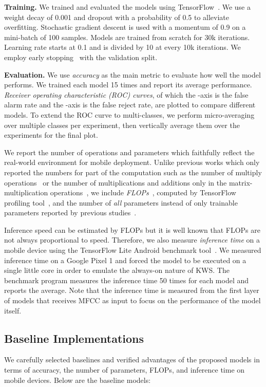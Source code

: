 \documentclass[a4paper]{article}
\begin{document}
\textbf{Training.}
We trained and evaluated the models using TensorFlow~\cite{abadi-osdi-2016-TensorFlow}. 
We use a weight decay of 0.001 and dropout with a probability of 0.5 to alleviate overfitting.
Stochastic gradient descent is used with a momentum of 0.9 on a mini-batch of 100 samples.
Models are trained from scratch for 30k iterations.
Learning rate starts at 0.1 and is divided by 10 at every 10k iterations.
We employ early stopping~\cite{prechelt-springer-1998-earlystop} with the validation split.

\textbf{Evaluation.}
We use \emph{accuracy} as the main metric to evaluate how well the model performs.
We trained each model 15 times and report its average performance.
\emph{Receiver operating characteristic (ROC) curves}, of which the -axis is the false alarm rate and the -axis is the false reject rate, are plotted to compare different models.
To extend the ROC curve to multi-classes, we perform micro-averaging over multiple classes per experiment, then vertically average them over the experiments for the final plot.

We report the number of operations and parameters which faithfully reflect the real-world environment for mobile deployment.
Unlike previous works which only reported the numbers for part of the computation such as the number of multiply operations~\cite{tang-icassp-2018-residual} or the number of multiplications and additions only in the matrix-multiplication operations~\cite{zhang-arxiv-2017-helloedge}, we include \emph{FLOPs}~\cite{arik-arxiv-2018-tensorflowprofiler}, computed by TensorFlow profiling tool~\cite{tensorflow-profile}, and the number of \emph{all} parameters instead of only trainable parameters reported by previous studies~\cite{tang-icassp-2018-residual}.

Inference speed can be estimated by FLOPs but it is well known that FLOPs are not always proportional to speed.
Therefore, we also measure \emph{inference time} on a mobile device using the TensorFlow Lite Android benchmark tool~\cite{tflite-model-benchmark-tool}.
We measured inference time on a Google Pixel 1 and forced the model to be executed on a single little core in order to emulate the always-on nature of KWS.
The benchmark program measures the inference time 50 times for each model and reports the average.
Note that the inference time is measured from the first layer of models that receives MFCC as input to focus on the performance of the model itself.


\subsection{Baseline Implementations}
We carefully selected baselines and verified advantages of the proposed models in terms of accuracy, the number of parameters, FLOPs, and inference time on mobile devices.
Below are the baseline models:
\end{document}
